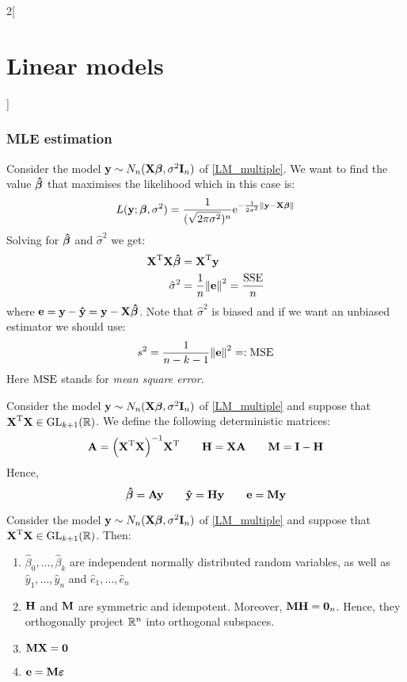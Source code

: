 \documentclass[../../../main_math.tex]{subfiles}
\begin{document}
\begin{multicols}{2}[\section{Linear models}]
  \subsubsection{MLE estimation}
  \begin{proposition}
    Consider the model $\boldsymbol{\mathrm{y}}\sim N_n(\boldsymbol{\mathrm{X\beta}},\sigma^2\boldsymbol{\mathrm{I}}_n)$ of \cref{LM_multiple}. We want to find the value $\boldsymbol{\mathrm{\hat\beta}}$ that maximises the likelihood which in this case is: $$L(\boldsymbol{\mathrm{y}};\boldsymbol{\mathrm{\beta}},\sigma^2)=\frac{1}{(\sqrt{2\pi\sigma^2})^n}\mathrm{e}^{-\frac{1}{2\sigma^2}{\left\|\boldsymbol{\mathrm{y}}-\boldsymbol{\mathrm{X\beta}}\right\|}}$$
    Solving for $\boldsymbol{\mathrm{\hat\beta}}$ and ${\hat\sigma}^2$ we get:
    \begin{align*}
      {\boldsymbol{\mathrm{X}}}^{\mathrm{T}}\boldsymbol{\mathrm{X\hat\beta}} & ={\boldsymbol{\mathrm{X}}}^{\mathrm{T}}\boldsymbol{\mathrm{y}}                    \\
      {\hat\sigma}^2                    & =\frac{1}{n}{\left\|\boldsymbol{\mathrm{e}}\right\|}^2=\frac{\operatorname{SSE}}{n}
    \end{align*}
    where $\boldsymbol{\mathrm{e}}=\boldsymbol{\mathrm{y}}-\boldsymbol{\mathrm{\hat{y}}}=\boldsymbol{\mathrm{y}}-\boldsymbol{\mathrm{X\hat{\beta}}}$. Note that ${\hat\sigma}^2$ is biased and if we want an unbiased estimator we should use:
    $${s}^2=\frac{1}{n-k-1}{\left\|\boldsymbol{\mathrm{e}}\right\|}^2=:\operatorname{MSE}$$
    Here $\operatorname{MSE}$ stands for \emph{mean square error}.
  \end{proposition}
  \begin{definition}
    Consider the model $\boldsymbol{\mathrm{y}}\sim N_n(\boldsymbol{\mathrm{X\beta}},\sigma^2\boldsymbol{\mathrm{I}}_n)$ of \cref{LM_multiple} and suppose that ${\boldsymbol{\mathrm{X}}}^{\mathrm{T}}\boldsymbol{\mathrm{X}}\in\mathrm{GL}_{k+1}(\mathbb{R})$. We define the following deterministic matrices:
    $$\boldsymbol{\mathrm{A}}={\left({\boldsymbol{\mathrm{X}}}^{\mathrm{T}}\boldsymbol{\mathrm{X}}\right)}^{-1}{\boldsymbol{\mathrm{X}}}^{\mathrm{T}}\qquad \boldsymbol{\mathrm{H}}=\boldsymbol{\mathrm{XA}}\qquad \boldsymbol{\mathrm{M}}=\boldsymbol{\mathrm{I}}-\boldsymbol{\mathrm{H}}$$
    Hence, $$\boldsymbol{\mathrm{\hat\beta}}=\boldsymbol{\mathrm{Ay}}\qquad\boldsymbol{\mathrm{\hat{y}}}=\boldsymbol{\mathrm{Hy}}\qquad\boldsymbol{\mathrm{e}}=\boldsymbol{\mathrm{My}}$$
  \end{definition}
  \begin{proposition}
    Consider the model $\boldsymbol{\mathrm{y}}\sim N_n(\boldsymbol{\mathrm{X\beta}},\sigma^2\boldsymbol{\mathrm{I}}_n)$ of \cref{LM_multiple} and suppose that ${\boldsymbol{\mathrm{X}}}^{\mathrm{T}}\boldsymbol{\mathrm{X}}\in\mathrm{GL}_{k+1}(\mathbb{R})$. Then:
    \begin{enumerate}
      \item $\hat\beta_0,\ldots,\hat\beta_k$ are independent normally distributed random variables, as well as $\hat{y}_1,\ldots,\hat{y}_n$ and $\hat{e}_1,\ldots,\hat{e}_n$
      \item $\boldsymbol{\mathrm{H}}$ and $\boldsymbol{\mathrm{M}}$ are symmetric and idempotent. Moreover, $\boldsymbol{\mathrm{MH}}=\boldsymbol{\mathrm{0}}_n$. Hence, they orthogonally project $\mathbb{R}^n$ into orthogonal subspaces.
      \item $\boldsymbol{\mathrm{MX}}=\boldsymbol{\mathrm{0}}$
      \item $\boldsymbol{\mathrm{e}}=\boldsymbol{\mathrm{M\varepsilon}}$

\end{enumerate}
\end{proposition}
\end{multicols}
\end{document}
